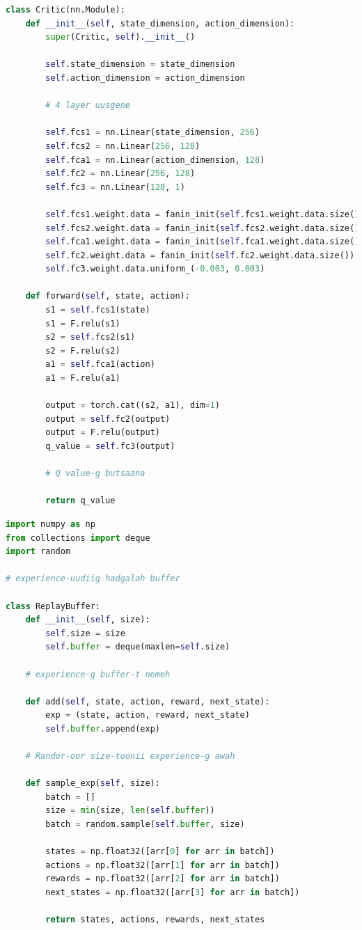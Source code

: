 \documentclass[12pt,A4]{report}
\begin{document}
\begin{lstlisting}[language=Python, caption=models.py, frame=single]
class Critic(nn.Module):
    def __init__(self, state_dimension, action_dimension):
        super(Critic, self).__init__()

        self.state_dimension = state_dimension
        self.action_dimension = action_dimension
        
        # 4 layer uusgene

        self.fcs1 = nn.Linear(state_dimension, 256)
        self.fcs2 = nn.Linear(256, 128)
        self.fca1 = nn.Linear(action_dimension, 128)
        self.fc2 = nn.Linear(256, 128)
        self.fc3 = nn.Linear(128, 1)

        self.fcs1.weight.data = fanin_init(self.fcs1.weight.data.size())
        self.fcs2.weight.data = fanin_init(self.fcs2.weight.data.size())
        self.fca1.weight.data = fanin_init(self.fca1.weight.data.size())
        self.fc2.weight.data = fanin_init(self.fc2.weight.data.size())
        self.fc3.weight.data.uniform_(-0.003, 0.003)

    def forward(self, state, action):
        s1 = self.fcs1(state)
        s1 = F.relu(s1)
        s2 = self.fcs2(s1)
        s2 = F.relu(s2)
        a1 = self.fca1(action)
        a1 = F.relu(a1)

        output = torch.cat((s2, a1), dim=1)
        output = self.fc2(output)
        output = F.relu(output)
        q_value = self.fc3(output)

        # Q value-g butsaana

        return q_value
\end{lstlisting}

\begin{lstlisting}[language=Python, caption=memory.py, frame=single]
import numpy as np
from collections import deque
import random

# experience-uudiig hadgalah buffer

class ReplayBuffer:
    def __init__(self, size):
        self.size = size
        self.buffer = deque(maxlen=self.size)

    # experience-g buffer-t nemeh

    def add(self, state, action, reward, next_state):
        exp = (state, action, reward, next_state)
        self.buffer.append(exp)

    # Randor-oor size-toonii experience-g awah

    def sample_exp(self, size):
        batch = []
        size = min(size, len(self.buffer))
        batch = random.sample(self.buffer, size)
        
        states = np.float32([arr[0] for arr in batch])
        actions = np.float32([arr[1] for arr in batch])
        rewards = np.float32([arr[2] for arr in batch])
        next_states = np.float32([arr[3] for arr in batch])
        
        return states, actions, rewards, next_states
\end{lstlisting}
\end{document}
